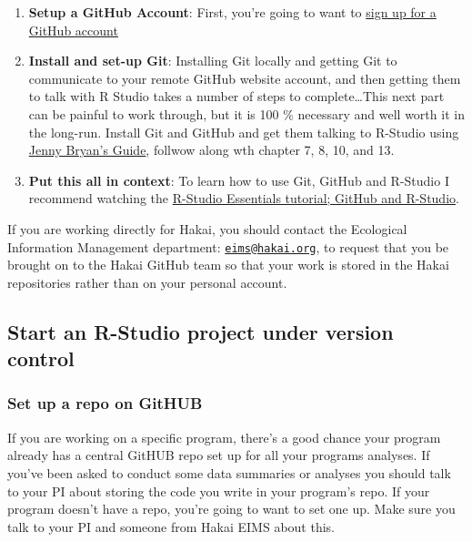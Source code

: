 \documentclass[]{book}
\begin{document}
\begin{enumerate}
\def\labelenumi{\arabic{enumi})}
\item
  \textbf{Setup a GitHub Account}: First, you're going to want to
  \href{https://github.com}{sign up for a GitHub account}
\item
  \textbf{Install and set-up Git}: Installing Git locally and getting
  Git to communicate to your remote GitHub website account, and then
  getting them to talk with R Studio takes a number of steps to
  complete\ldots{}This next part can be painful to work through, but it
  is 100 \% necessary and well worth it in the long-run. Install Git and
  GitHub and get them talking to R-Studio using
  \href{http://happygitwithr.com/install-git.html}{Jenny Bryan's Guide},
  follwow along wth chapter 7, 8, 10, and 13.
\item
  \textbf{Put this all in context}: To learn how to use Git, GitHub and
  R-Studio I recommend watching the
  \href{https://www.rstudio.com/resources/webinars/rstudio-essentials-webinar-series-managing-part-2/}{R-Studio
  Essentials tutorial; GitHub and R-Studio}.
\end{enumerate}

If you are working directly for Hakai, you should contact the Ecological
Information Management department:
\href{mailto:eims@hakai.org}{\nolinkurl{eims@hakai.org}}, to request
that you be brought on to the Hakai GitHub team so that your work is
stored in the Hakai repositories rather than on your personal account.

\subsection{Start an R-Studio project under version
control}\label{start-an-r-studio-project-under-version-control}

\subsubsection{Set up a repo on GitHUB}\label{set-up-a-repo-on-github}

If you are working on a specific program, there's a good chance your
program already has a central GitHUB repo set up for all your programs
analyses. If you've been asked to conduct some data summaries or
analyses you should talk to your PI about storing the code you write in
your program's repo. If your program doesn't have a repo, you're going
to want to set one up. Make sure you talk to your PI and someone from
Hakai EIMS about this.
\end{document}
